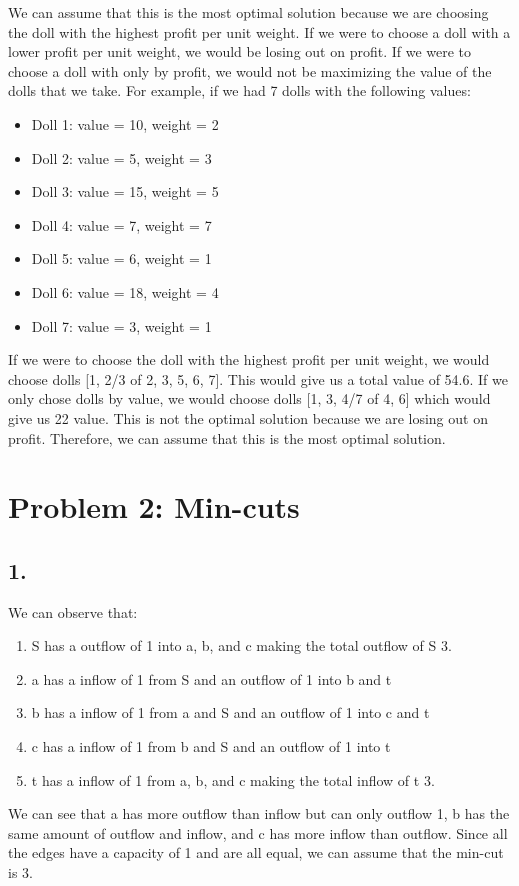\documentclass[12pt,letterpaper]{article}
\begin{document}
We can assume that this is the most optimal solution because we are choosing the doll with
the highest profit per unit weight. If we were to choose a doll with a lower profit per unit
weight, we would be losing out on profit. If we were to choose a doll with only by
profit, we would not be maximizing the value of the dolls that we take. 
For example, if we had 7 dolls with the following values:
\begin{itemize}
  \item Doll 1: value = 10, weight = 2
  \item Doll 2: value = 5, weight = 3
  \item Doll 3: value = 15, weight = 5
  \item Doll 4: value = 7, weight = 7
  \item Doll 5: value = 6, weight = 1
  \item Doll 6: value = 18, weight = 4
  \item Doll 7: value = 3, weight = 1
\end{itemize}
If we were to choose the doll with the highest profit per unit weight, we would choose 
dolls [1, 2/3 of 2, 3, 5, 6, 7]. This would give us a total value of 
54.6. If we only chose dolls by value, we would choose dolls [1, 3, 4/7 of 4, 6] which would
give us 22 value. This is not the optimal solution because we are losing out on profit. Therefore,
we can assume that this is the most optimal solution.

\section*{Problem 2: Min-cuts}

\subsection*{1.}
We can observe that:
\begin{enumerate}
  \item S has a outflow of 1 into a, b, and c making the total outflow of S 3.
  \item a has a inflow of 1 from S and an outflow of 1 into b and t
  \item b has a inflow of 1 from a and S and an outflow of 1 into c and t
  \item c has a inflow of 1 from b and S and an outflow of 1 into t
  \item t has a inflow of 1 from a, b, and c making the total inflow of t 3.
\end{enumerate}
We can see that a has more outflow than inflow but can only outflow 1, b has the same amount of outflow and inflow, and
c has more inflow than outflow. Since all the edges have a capacity of 1 and are all equal, we can assume that the
min-cut is 3. 
\end{document}
